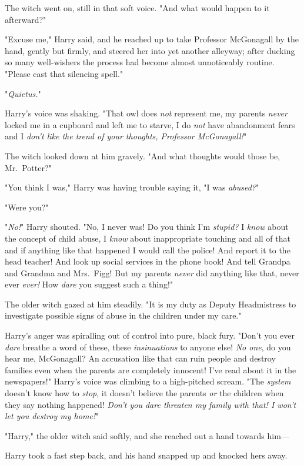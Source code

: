 The witch went on, still in that soft voice. "And what would happen to it
afterward?"

"Excuse me," Harry said, and he reached up to take Professor McGonagall by the
hand, gently but firmly, and steered her into yet another alleyway; after
ducking so many well-wishers the process had become almost unnoticeably
routine. "Please cast that silencing spell."

"\emph{Quietus.}"

Harry's voice was shaking. "That owl does \emph{not} represent me, my parents
\emph{never} locked me in a cupboard and left me to starve, I do \emph{not}
have abandonment fears and I \emph{don't like the trend of your thoughts,
Professor McGonagall!}"

The witch looked down at him gravely. "And what thoughts would those be,
Mr.~Potter?"

"You think I was," Harry was having trouble saying it, "I was \emph{abused?}"

"Were you?"

"\emph{No!}" Harry shouted. "No, I never was! Do you think I'm \emph{stupid?} I
\emph{know} about the concept of child abuse, I \emph{know} about inappropriate
touching and all of that and if anything like that happened I would call the
police! And report it to the head teacher! And look up social services in the
phone book! And tell Grandpa and Grandma and Mrs.~Figg! But my parents
\emph{never} did anything like that, never ever \emph{ever!} How \emph{dare}
you suggest such a thing!"

The older witch gazed at him steadily. "It is my duty as Deputy Headmistress to
investigate possible signs of abuse in the children under my care."

Harry's anger was spiralling out of control into pure, black fury. "Don't you
ever \emph{dare} breathe a word of these, these \emph{insinuations} to anyone
else! \emph{No one}, do you hear me, McGonagall? An accusation like that can
ruin people and destroy families even when the parents are completely innocent!
I've read about it in the newspapers!" Harry's voice was climbing to a
high-pitched scream. "The \emph{system} doesn't know how to \emph{stop}, it
doesn't believe the parents \emph{or} the children when they say nothing
happened! \emph{Don't you dare threaten my family with that! I won't let you
destroy my home!}"

"Harry," the older witch said softly, and she reached out a hand towards him—

Harry took a fast step back, and his hand snapped up and knocked hers away.

